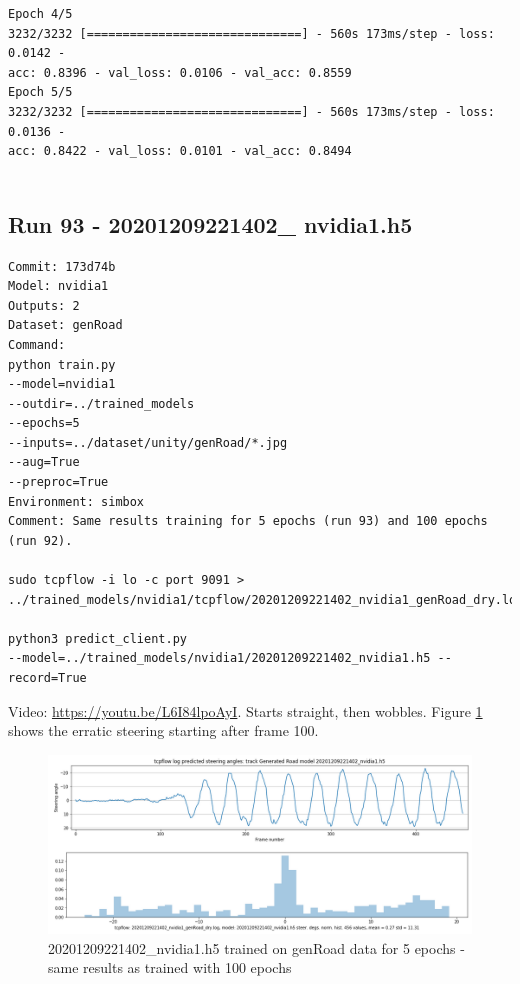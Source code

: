 \begin{verbatim}
Epoch 4/5
3232/3232 [==============================] - 560s 173ms/step - loss: 0.0142 - 
acc: 0.8396 - val_loss: 0.0106 - val_acc: 0.8559
Epoch 5/5
3232/3232 [==============================] - 560s 173ms/step - loss: 0.0136 - 
acc: 0.8422 - val_loss: 0.0101 - val_acc: 0.8494
    
\end{verbatim}

\subsection{Run 93 - 20201209221402\_ nvidia1.h5 }
\label{app_res:93}
\begin{verbatim}
Commit: 173d74b
Model: nvidia1
Outputs: 2
Dataset: genRoad
Command:
python train.py
--model=nvidia1
--outdir=../trained_models
--epochs=5
--inputs=../dataset/unity/genRoad/*.jpg
--aug=True
--preproc=True
Environment: simbox
Comment: Same results training for 5 epochs (run 93) and 100 epochs (run 92).

sudo tcpflow -i lo -c port 9091 >
../trained_models/nvidia1/tcpflow/20201209221402_nvidia1_genRoad_dry.log

python3 predict_client.py 
--model=../trained_models/nvidia1/20201209221402_nvidia1.h5 --record=True
\end{verbatim}

Video: \url{https://youtu.be/L6I84lpoAyI}. Starts straight, then wobbles. 
Figure \ref{fig:20201209221402_nvidia1_genRoad_dry} shows the erratic steering starting after frame 100.
\begin{figure}[ht]
 \centering 
 \includegraphics[width=\textwidth]{Figures/20201209221402_nvidia1_genRoad_dry.png}
 \caption{20201209221402_nvidia1.h5 trained on genRoad data for 5 epochs - same results as trained with 100 epochs}
 \label{fig:20201209221402_nvidia1_genRoad_dry} 
\end{figure}

